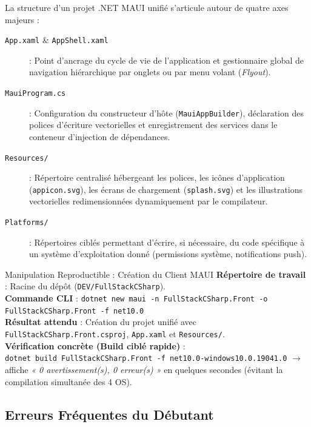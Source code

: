 La structure d'un projet .NET MAUI unifié s'articule autour de quatre axes majeurs :

\begin{description}
    \item[\color{indigo}\texttt{App.xaml} \& \texttt{AppShell.xaml}] : Point d'ancrage du cycle de vie de l'application et gestionnaire global de navigation hiérarchique par onglets ou par menu volant (\textit{Flyout}).
    \item[\color{secondary}\texttt{MauiProgram.cs}] : Configuration du constructeur d'hôte (\texttt{MauiAppBuilder}), déclaration des polices d'écriture vectorielles et enregistrement des services dans le conteneur d'injection de dépendances.
    \item[\color{cyanproj!90!black}\texttt{Resources/}] : Répertoire centralisé hébergeant les polices, les icônes d'application (\texttt{appicon.svg}), les écrans de chargement (\texttt{splash.svg}) et les illustrations vectorielles redimensionnées dynamiquement par le compilateur.
    \item[\color{emerald!80!black}\texttt{Platforms/}] : Répertoires ciblés permettant d'écrire, si nécessaire, du code spécifique à un système d'exploitation donné (permissions système, notifications push).
\end{description}

\vspace{0.3cm}

\begin{bestpracticebox}{Manipulation Reproductible : Création du Client MAUI}
\textbf{Répertoire de travail} : Racine du dépôt (\texttt{DEV/FullStackCSharp}).\\[2pt]
\textbf{Commande CLI} : \texttt{dotnet new maui -n FullStackCSharp.Front -o FullStackCSharp.Front -f net10.0}\\[2pt]
\textbf{Résultat attendu} : Création du projet unifié avec \texttt{FullStackCSharp.Front.csproj}, \texttt{App.xaml} et \texttt{Resources/}.\\[2pt]
\textbf{Vérification concrète (Build ciblé rapide)} :\\
\texttt{dotnet build FullStackCSharp.Front -f net10.0-windows10.0.19041.0} $\longrightarrow$ affiche \textit{« 0 avertissement(s), 0 erreur(s) »} en quelques secondes (évitant la compilation simultanée des 4 OS).
\end{bestpracticebox}

\vspace{0.2cm}

\subsection*{Erreurs Fréquentes du Débutant}

